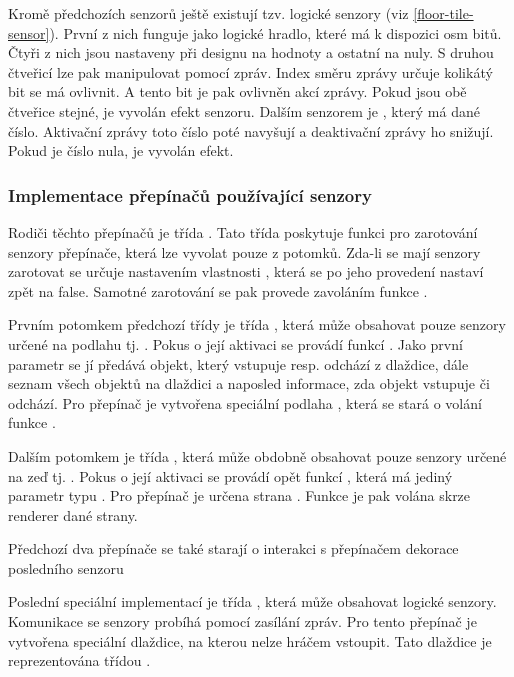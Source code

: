 Kromě předchozích senzorů ještě existují tzv. logické senzory (viz \ref{floor-tile-sensor}). První z nich  funguje 
jako logické hradlo, které má k dispozici osm bitů. Čtyři z nich jsou nastaveny při designu na hodnoty a ostatní na nuly. 
S druhou čtveřicí lze pak manipulovat pomocí zpráv. Index směru zprávy určuje kolikátý bit se má ovlivnit. A tento bit
je pak ovlivněn akcí zprávy. Pokud jsou obě čtveřice stejné, je vyvolán efekt senzoru. Dalším
senzorem je , který má dané číslo. Aktivační zprávy toto číslo poté navyšují a deaktivační zprávy
ho snižují. Pokud je číslo  nula, je vyvolán efekt.
 
\subsubsection{Implementace přepínačů používající senzory}

Rodiči těchto přepínačů je třída . Tato třída poskytuje funkci pro zarotování senzory přepínače, která
lze vyvolat pouze z potomků. Zda-li se mají senzory zarotovat se určuje nastavením vlastnosti , která se po jeho 
provedení nastaví zpět na false. Samotné zarotování se pak provede zavoláním funkce .

Prvním potomkem předchozí třídy je třída , která může obsahovat pouze senzory určené
na podlahu tj. . Pokus o její aktivaci se provádí funkcí . Jako první parametr se jí předává objekt,
který vstupuje resp. odchází z dlaždice, dále seznam všech objektů na dlaždici a naposled informace, zda objekt
vstupuje či odchází. Pro přepínač je vytvořena speciální podlaha , která se stará 
o volání funkce .

Dalším potomkem je třída , která může obdobně obsahovat pouze senzory určené na zeď tj. .
Pokus o její aktivaci se provádí opět funkcí , která má jediný parametr typu . Pro přepínač
je určena strana . Funkce  je pak volána skrze renderer dané strany. 

Předchozí dva přepínače se také starají o interakci s přepínačem dekorace posledního senzoru 

Poslední speciální implementací je třída , která může obsahovat logické senzory.
Komunikace se senzory probíhá pomocí zasílání zpráv. Pro tento přepínač je vytvořena speciální dlaždice,
na kterou nelze hráčem vstoupit. Tato dlaždice je reprezentována třídou . 

